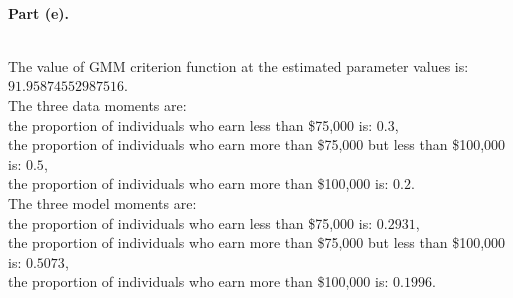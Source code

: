 \documentclass[letterpaper,12pt]{article}
\theoremstyle{definition}
\begin{document}
\\
\noindent\textbf{Part (e).}\\
\begin{figure}[htb]\centering\captionsetup{width=4.0in}
  \label{Fig1e}
\end{figure}
\\
The value of GMM criterion function at the estimated parameter values is: \\
$91.95874552987516$.\\
The three data moments are: \\
the proportion of individuals who earn less than \$75,000 is: $0.3$, \\
the proportion of individuals who earn more than \$75,000 but less than \$100,000 is: $0.5$, \\
the proportion of individuals who earn more than \$100,000 is: $0.2$. \\
The three model moments are: \\
the proportion of individuals who earn less than \$75,000 is: $0.2931$, \\
the proportion of individuals who earn more than \$75,000 but less than \$100,000 is: $0.5073$, \\
the proportion of individuals who earn more than \$100,000 is: $0.1996$.\\
\end{document}
